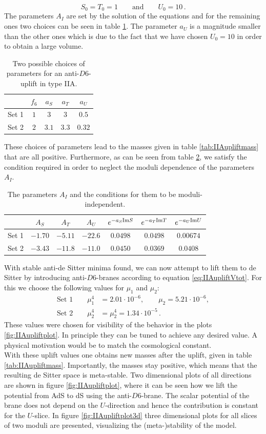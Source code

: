 \documentclass[a4paper,12pt,twoside,openright]{report}
\newcommand{\be}{\begin{equation}}
\newcommand{\ee}{\end{equation}}
\newcommand{\bea}{\begin{equation}\begin{aligned}}
\newcommand{\eea}{\end{aligned}\end{equation}}
\begin{document}
\be 
S_0 = T_0=1 \qquad \text{and}\qquad U_0=10\,.
\ee
The parameters $A_I$ are set by the solution of the equations and for the remaining ones two choices can be seen in table \ref{tab:IIAupliftpar}. The parameter $a_U$ is a magnitude smaller than the other ones which is due to the fact that we have chosen $U_0=10$ in order to obtain a large volume.
\begin{table}[H]
\center
\begin{tabular}{|c|c|c|c|c|}\hline
 & $f_6$ & $a_S$ & $a_T$ & $a_U$ \\\hline
Set 1 & $1$ & $3$ & $3$ & $0.5$ \\\hline
Set 2 &$2$ & $3.1$ & $3.3$ & $0.32$ \\\hline
\end{tabular}
\caption{Two possible choices of parameters for an anti-$D6$-uplift in type IIA.}
\label{tab:IIAupliftpar}
\end{table}
These choices of parameters lead to the masses given in table \ref{tab:IIAupliftmass} that are all positive. Furthermore, as can be seen from table \ref{tab:IIAupliftreq}, we satisfy the condition required in order to neglect the moduli dependence of the parameters $A_I$.
\begin{table}[H]
\center
\begin{tabular}{|c|c|c|c||c|c|c|}\hline
 & $A_S$ & $A_T$ & $A_U$  & $e^{-a_S {\rm Im} S}$ & $e^{-a_T {\rm Im} T}$ & $e^{-a_U {\rm Im} U}$  \\\hline
Set 1 & $-1.70$ & $-5.11$ & $-22.6$ & $0.0498$ & $0.0498$ & $0.00674$  \\\hline
Set 2 & $-3.43$ & $-11.8$ & $-11.0$ & $0.0450$ & $0.0369$ & $0.0408$  \\\hline
\end{tabular}
\caption{The parameters $A_I$ and the conditions for them to be moduli-independent.}
\label{tab:IIAupliftreq}
\end{table}
With stable anti-de Sitter minima found, we can now attempt to lift them to de Sitter by introducing anti-$D6$-branes according to equation \eqref{eq:IIAupliftVtot}. For this we choose the following values for $\mu_1$ and $\mu_2$:
\bea 
\text{Set 1} \qquad \mu_1^4 &= 2.01 \cdot 10^{-6}, \qquad \mu_2 = 5.21 \cdot 10^{-6},\\
\text{Set 2} \qquad \mu_2^4 &= \mu_2^4 = 1.34 \cdot 10^{-5}\,.
\eea
These values were chosen for visibility of the behavior in the plots \ref{fig:IIAupliftplot}. In principle they can be tuned to achieve any desired value. A physical motivation would be to match the cosmological constant.\\
With these uplift values one obtains new masses after the uplift, given in table \ref{tab:IIAupliftmass}. Importantly, the masses stay positive, which means that the resulting de Sitter space is meta-stable. Two dimensional plots of all directions are shown in figure \ref{fig:IIAupliftplot}, where it can be seen how we lift the potential from AdS to dS using the anti-$D6$-brane. The scalar potential of the brane does not depend on the $U$-direction and hence the contribution is constant for the $U$-slice. In figure \ref{fig:IIAupliftplot3d} three dimensional plots for all slices of two moduli are presented, visualizing the (meta-)stability of the model. 
\end{document}
